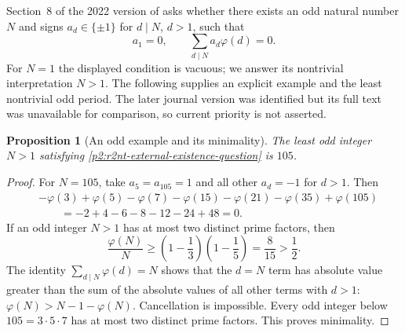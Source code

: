 \documentclass[11pt,a4paper]{article}
\newtheorem{proposition}[theorem]{Proposition}
\theoremstyle{definition}
\theoremstyle{remark}
\numberwithin{equation}{section}
\begin{document}
Section~8 of the 2022 version of \cite{p2:Bharadwaj2022} asks whether
there exists an odd natural number $N$ and signs $a_d\in\{\pm1\}$ for
$d\mid N$, $d>1$, such that
\begin{equation}
\label{p2:r2nt-external-existence-question}
 a_1=0,\qquad \sum_{d\mid N}a_d\varphi(d)=0.
\end{equation}
For $N=1$ the displayed condition is vacuous; we answer its
nontrivial interpretation $N>1$.  The following supplies an explicit
example and the least nontrivial odd period.
The later journal version was identified but its full
text was unavailable for comparison, so current priority is not
asserted.

\begin{proposition}[An odd example and its minimality]
\label{p2:r2nt-smallest-example}
The least odd integer $N>1$ satisfying
\eqref{p2:r2nt-external-existence-question} is $105$.
\end{proposition}
\begin{proof}
For $N=105$, take $a_5=a_{105}=1$ and all other $a_d=-1$
for $d>1$.  Then
\begin{align*}
 &-\varphi(3)+\varphi(5)-\varphi(7)-\varphi(15)
 -\varphi(21)-\varphi(35)+\varphi(105)\\
 &\hspace{2em}=-2+4-6-8-12-24+48=0.
\end{align*}
If an odd integer $N>1$ has at most two distinct prime factors,
then
\[
 \frac{\varphi(N)}N\ge
 \left(1-\frac13\right)\left(1-\frac15\right)
 =\frac8{15}>\frac12.
\]
The identity $\sum_{d\mid N}\varphi(d)=N$ shows that the
$d=N$ term has absolute value greater than the sum of the absolute
values of all other terms with $d>1$:
$\varphi(N)>N-1-\varphi(N)$.  Cancellation is impossible.
Every odd integer below $105=3\cdot5\cdot7$ has at most two
distinct prime factors.  This proves minimality.
\end{proof}
\end{document}
